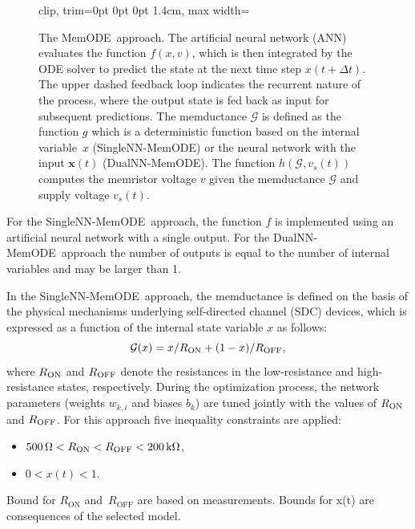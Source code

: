 \documentclass[a4,journal]{IEEEtran}
\newcommand{\G}{\mathcal{G}} %
\newcommand{\Gm}{\mathcal{G}} %
\newcommand{\Ron}{R_{\rm ON}}
\newcommand{\Roff}{R_{\rm OFF}}
\newcommand{\vm}{v}  %
\newcommand{\Ohm}{\,\Omega} %
\newcommand{\kOhm}{\,{\rm k}\Omega}
\newcommand{\MemODEOne}{SingleNN-MemODE}
\newcommand{\MemODETwo}{DualNN-MemODE}
\newcommand{\MemODE}{MemODE}
\begin{document}
\begin{figure}[htbp]
  \centering
  \begin{adjustbox}{clip, trim=0pt 0pt 0pt 1.4cm, max width=\columnwidth}
    
  \end{adjustbox}
  \caption{The \MemODE\ approach. The artificial neural network (ANN) evaluates the function \(f\!(x,v)\), which is then integrated by the ODE solver to predict the state at the next time step \(x\!(t + \Delta t)\). The upper dashed feedback loop indicates the recurrent nature of the process, where the output state is fed back as input for subsequent predictions. The memductance \(\Gm\) is defined as the function \(g\) which is a deterministic function based on the internal variable~\(x\) (\MemODEOne) or the neural network with the input \(\mathbf{x}\!(t)\) (\MemODETwo). The function \(h\!(\G, v_s\!(t))\) computes the memristor voltage \(\vm\) given the memductance \(\G\) and supply voltage \(v_s\!(t)\).
  }
  \label{fig:nn_structure}
\end{figure}

For the \MemODEOne\ approach, the function \(f\) is implemented using an artificial neural network with a single output. For the \MemODETwo\ approach the number of outputs is equal to the number of internal variables and may be larger than 1.

In the \MemODEOne\ approach, the  memductance is defined on the basis of the physical mechanisms underlying self-directed channel (SDC) devices, which is expressed as a function of the internal state variable \(x\) as follows:
\begin{equation}
  \Gm(x) = x/R_{\rm ON} + (1 - x)/R_{\rm OFF},
  \label{eq:conductance}
\end{equation}
where \(\Ron\) and \(\Roff\) denote the resistances in the low-resistance and high-resistance states, respectively. During the optimization process, the network parameters (weights \(w_{k,i}\) and biases \(b_k\)) are tuned jointly with the values of \(\Ron\) and \(\Roff\). For this approach five inequality constraints are applied:
\begin{itemize}
\item \(500\Ohm<R_{\mathrm{ON}}<R_{\mathrm{OFF}}<200\kOhm\),
\item \(0<x(t)<1\).
\end{itemize}
Bound for \(R_{\mathrm{ON}}\) and~\(R_{\mathrm{OFF}}\) are based on measurements. Bounds for x(t) are consequences of the selected model. 
\end{document}
